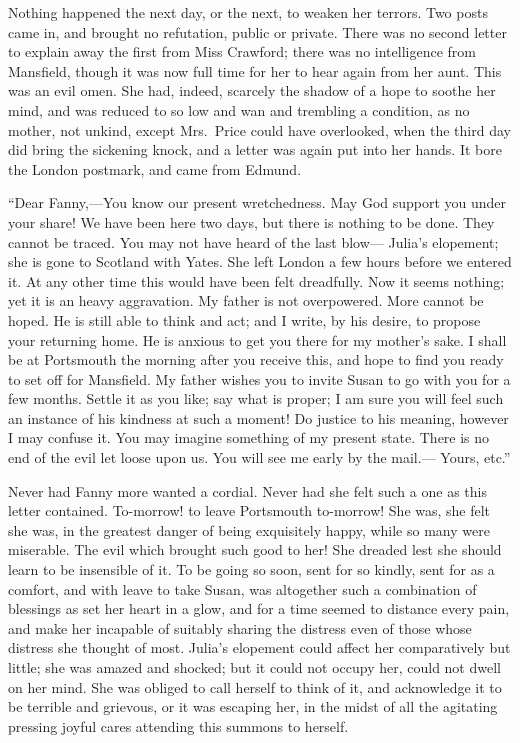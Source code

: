 \documentclass{article}
\begin{document}
Nothing happened the next day, or the next, to weaken
her terrors.  Two posts came in, and brought no refutation,
public or private.  There was no second letter to explain
away the first from Miss Crawford; there was no intelligence
from Mansfield, though it was now full time for her
to hear again from her aunt.  This was an evil omen.
She had, indeed, scarcely the shadow of a hope to soothe
her mind, and was reduced to so low and wan and trembling
a condition, as no mother, not unkind, except Mrs.\ Price
could have overlooked, when the third day did bring the
sickening knock, and a letter was again put into her hands.
It bore the London postmark, and came from Edmund.

``Dear Fanny,---You know our present wretchedness.
May God support you under your share!  We have been here
two days, but there is nothing to be done.  They cannot
be traced.  You may not have heard of the last blow---%
Julia's elopement; she is gone to Scotland with Yates.
She left London a few hours before we entered it.
At any other time this would have been felt dreadfully.
Now it seems nothing; yet it is an heavy aggravation.
My father is not overpowered.  More cannot be hoped.
He is still able to think and act; and I write,
by his desire, to propose your returning home.
He is anxious to get you there for my mother's sake.
I shall be at Portsmouth the morning after you receive this,
and hope to find you ready to set off for Mansfield.
My father wishes you to invite Susan to go with you for a
few months.  Settle it as you like; say what is proper;
I am sure you will feel such an instance of his
kindness at such a moment!  Do justice to his meaning,
however I may confuse it.  You may imagine something
of my present state.  There is no end of the evil let
loose upon us.  You will see me early by the mail.---%
Yours, etc.''

Never had Fanny more wanted a cordial.  Never had she felt
such a one as this letter contained.  To-morrow! to leave
Portsmouth to-morrow! She was, she felt she was, in the
greatest danger of being exquisitely happy, while so many
were miserable.  The evil which brought such good to her!
She dreaded lest she should learn to be insensible of it.
To be going so soon, sent for so kindly, sent for as
a comfort, and with leave to take Susan, was altogether
such a combination of blessings as set her heart in
a glow, and for a time seemed to distance every pain,
and make her incapable of suitably sharing the distress
even of those whose distress she thought of most.
Julia's elopement could affect her comparatively but little;
she was amazed and shocked; but it could not occupy her,
could not dwell on her mind.  She was obliged to call
herself to think of it, and acknowledge it to be terrible
and grievous, or it was escaping her, in the midst of all
the agitating pressing joyful cares attending this summons
to herself.
\end{document}
